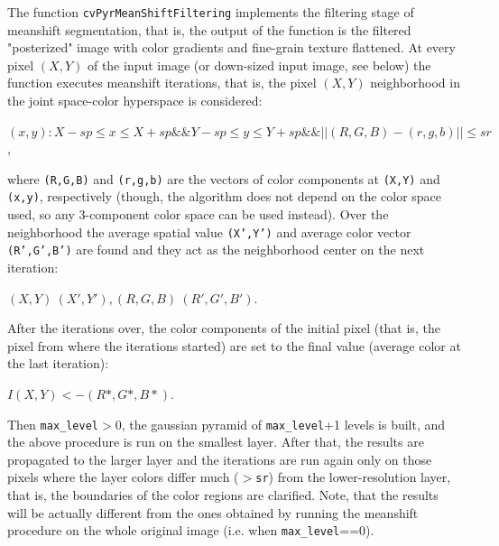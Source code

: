 \begin{description}
\end{description}

The function \texttt{cvPyrMeanShiftFiltering} implements the filtering stage of meanshift segmentation, that is, the output of the function is the filtered "posterized" image with color gradients and fine-grain texture flattened. At every pixel $(X,Y)$ of the input image (or down-sized input image, see below) the function executes meanshift iterations, that is, the pixel $(X,Y)$ neighborhood in the joint space-color hyperspace is considered: 

{$(x,y): X-sp≤x≤X+sp \&\& Y-sp≤y≤Y+sp \&\& ||(R,G,B)-(r,g,b)|| ≤ sr$},

where \texttt{(R,G,B)} and \texttt{(r,g,b)} are the vectors of color components at \texttt{(X,Y)} and \texttt{(x,y)}, respectively (though, the algorithm does not depend on the color space used, so any 3-component color space can be used instead). Over the neighborhood the average spatial value \texttt{(X',Y')} and average color vector \texttt{(R',G',B')} are found and they act as the neighborhood center on the next iteration: 

$(X,Y)~(X',Y'), (R,G,B)~(R',G',B').$

After the iterations over, the color components of the initial pixel (that is, the pixel from where the iterations started) are set to the final value (average color at the last iteration): 

$I(X,Y) <- (R*,G*,B*).$

Then \texttt{max\_level}$>$0, the gaussian pyramid of \texttt{max\_level}+1 levels is built, and the above procedure is run on the smallest layer. After that, the results are propagated to the larger layer and the iterations are run again only on those pixels where the layer colors differ much ($>$\texttt{sr}) from the lower-resolution layer, that is, the boundaries of the color regions are clarified. Note, that the results will be actually different from the ones obtained by running the meanshift procedure on the whole original image (i.e. when \texttt{max\_level}==0).



